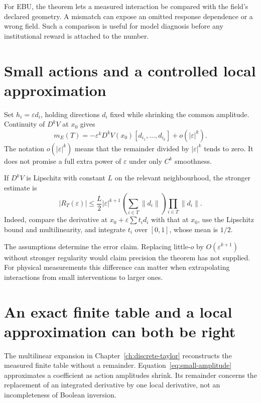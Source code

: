 For EBU, the theorem lets a measured interaction be compared with the field's declared geometry. A mismatch can expose an omitted response dependence or a wrong field. Such a comparison is useful for model diagnosis before any institutional reward is attached to the number.

\section{Small actions and a controlled local approximation}
Set $h_i=\varepsilon d_i$, holding directions $d_i$ fixed while shrinking the common amplitude. Continuity of $D^kV$ at $x_0$ gives
\begin{equation}\label{eq:small-amplitude}
 m_E(T)=-\varepsilon^kD^kV(x_0)[d_{i_1},\ldots,d_{i_k}]
          +o(|\varepsilon|^k).
\end{equation}
The notation $o(|\varepsilon|^k)$ means that the remainder divided by $|\varepsilon|^k$ tends to zero. It does not promise a full extra power of $\varepsilon$ under only $C^k$ smoothness.

If $D^kV$ is Lipschitz with constant $L$ on the relevant neighbourhood, the stronger estimate is
\begin{equation}\label{eq:lipschitz-remainder}
 |R_T(\varepsilon)|\leq
 \frac L2|\varepsilon|^{k+1}
 \left(\sum_{i\in T}\|d_i\|\right)
 \prod_{i\in T}\|d_i\|.
\end{equation}
Indeed, compare the derivative at $x_0+\varepsilon\sum t_i d_i$ with that at $x_0$, use the Lipschitz bound and multilinearity, and integrate $t_i$ over $[0,1]$, whose mean is $1/2$.

The assumptions determine the error claim. Replacing little-$o$ by $O(\varepsilon^{k+1})$ without stronger regularity would claim precision the theorem has not supplied. For physical measurements this difference can matter when extrapolating interactions from small interventions to larger ones.

\section{An exact finite table and a local approximation can both be right}
The multilinear expansion in Chapter~\ref{ch:discrete-taylor} reconstructs the measured finite table without a remainder. Equation~\ref{eq:small-amplitude} approximates a coefficient as action amplitudes shrink. Its remainder concerns the replacement of an integrated derivative by one local derivative, not an incompleteness of Boolean inversion.

